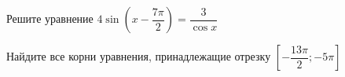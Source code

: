 \begin{ex}
	\begin{condition}
		\begin{enumcols}[label=\asbuk*)]
			\item Решите уравнение \(4\sin{\left(x - \dfrac{7\pi }{2}\right)} = \dfrac{3}{\cos x}  \)
			\item Найдите все корни уравнения, принадлежащие отрезку \( \left[-\dfrac{13\pi}{2};-5\pi\right] \)
		\end{enumcols}
	\end{condition}
\end{ex}